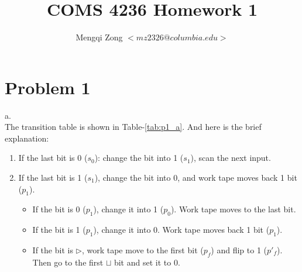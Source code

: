 \documentclass[12pt]{article}
\title{COMS 4236 Homework 1}
\author{Mengqi Zong $<mz2326@columbia.edu>$}
\begin{document}
\maketitle

\setlength{\parindent}{0in}

\section{Problem 1}


a.\\
The transition table is shown in Table-\ref{tab:p1_a}. And here is the
brief explanation:

\begin{enumerate}
\item If the last bit is 0 ($s_0$): change the bit into 1 ($s_1$),
  scan the next input.
\item If the last bit is 1 ($s_1$), change the bit into 0, and work
  tape moves back 1 bit ($p_1$).
  \begin{itemize}
  \item If the bit is 0 ($p_1$), change it into 1 ($p_0$). Work tape
    moves to the last bit.
  \item If the bit is 1 ($p_1$), change it into 0. Work tape moves back
    1 bit ($p_1$).
  \item If the bit is $\triangleright$, work tape move to the first
    bit ($p_f$) and flip to 1 ($p'_f$). Then go to the first $\sqcup$
    bit and set it to 0.
  \end{itemize}
\end{enumerate}
\end{document}
